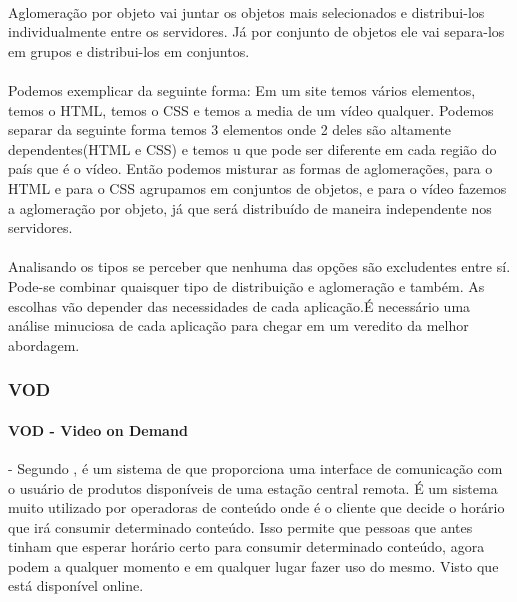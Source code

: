 \paragraph{} Aglomera\c{c}\~ao por objeto vai juntar os objetos mais selecionados e distribui-los individualmente entre os servidores. J\'a por conjunto de objetos ele vai separa-los em grupos e distribui-los em conjuntos. 
\paragraph{} Podemos exemplicar da seguinte forma: Em um site temos v\'arios elementos, temos o HTML, temos o CSS e temos a media de um v\'ideo qualquer. Podemos separar da seguinte forma temos 3 elementos onde 2 deles s\~ao altamente dependentes(HTML e CSS) e temos u que pode ser diferente em cada regi\~ao do pa\'is que \'e o v\'ideo. Ent\~ao podemos misturar as formas de aglomera\c{c}\~oes, para o HTML e para o CSS agrupamos em conjuntos de objetos, e para o v\'ideo fazemos a aglomera\c{c}\~ao por objeto, j\'a que ser\'a distribu\'ido de maneira independente nos servidores.

\paragraph{} Analisando os tipos se perceber que nenhuma das op\c{c}\~oes s\~ao excludentes entre s\'i. Pode-se combinar quaisquer tipo de distribui\c{c}\~ao e aglomera\c{c}\~ao e tamb\'em. As escolhas v\~ao depender das necessidades de cada aplica\c{c}\~ao.\'E necess\'ario uma an\'alise minuciosa de cada aplica\c{c}\~ao para chegar em um veredito da melhor abordagem.
\subsubsection{VOD}
\paragraph{VOD - Video on Demand} - Segundo \cite{garfinkle1996video}, \'e um sistema de que proporciona uma interface de comunica\c{c}\~ao com o usu\'ario de produtos dispon\'iveis de uma esta\c{c}\~ao central remota.
\newline \'E um sistema muito utilizado por operadoras de conte\'udo onde \'e o cliente que decide o hor\'ario que ir\'a consumir determinado conte\'udo.
\newline Isso permite que pessoas que antes tinham que esperar hor\'ario certo para consumir determinado conte\'udo, agora podem a qualquer momento e em qualquer lugar fazer uso do mesmo. Visto que est\'a dispon\'ivel online.
